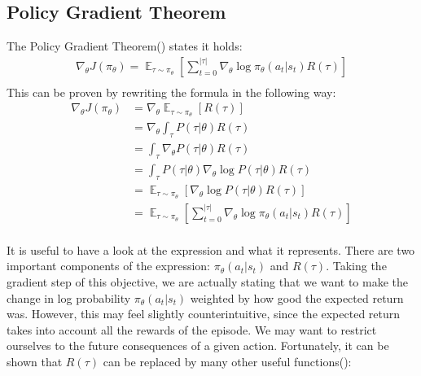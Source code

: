 \subsection{Policy Gradient Theorem}
The Policy Gradient Theorem(\cite{sutton2018reinforcement}) states it holds: 
\begin{align*}
  \nabla_\theta J(\pi_\theta) = \mathop{\mathbb{E}}_{\tau \sim \pi_\theta}[\sum_{t=0}^{|\tau|} \nabla_\theta \log \pi_\theta(a_t|s_t) R(\tau)] \\
\end{align*}
This can be proven by rewriting the formula in the following way:
\begin{align*}
  \nabla_\theta J(\pi_\theta) &= \nabla_\theta \mathop{\mathbb{E}}_{\tau \sim \pi_\theta}[R(\tau)] \\
  &= \nabla_\theta \int_{\tau}^{}P(\tau|\theta)R(\tau) \\
  &= \int_{\tau}^{} \nabla_\theta P(\tau|\theta)R(\tau) \\
  &= \int_{\tau}^{} P(\tau|\theta)\nabla_\theta \log P(\tau|\theta)R(\tau) \\
  &= \mathop{\mathbb{E}}_{\tau \sim \pi_\theta}[\nabla_\theta \log P(\tau|\theta)R(\tau)] \\
  &= \mathop{\mathbb{E}}_{\tau \sim \pi_\theta}[\sum_{t=0}^{|\tau|}  \nabla_\theta \log \pi_\theta(a_t|s_t) R(\tau)] \\
\end{align*}

It is useful to have a look at the expression and what it represents. 
There are two important components of the expression: $\pi_\theta(a_t|s_t)$ and $R(\tau)$.
Taking the gradient step of this objective, we are actually stating that we want to make the change in log probability $\pi_\theta(a_t|s_t)$ weighted by how good the expected return was.
However, this may feel slightly counterintuitive, since the expected return takes into account all the rewards of the episode.
We may want to restrict ourselves to the future consequences of a given action.
Fortunately, it can be shown that $R(\tau)$ can be replaced by many other useful functions(\cite{GAE}):

